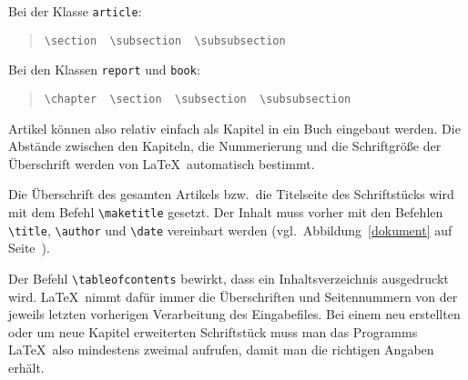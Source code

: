 \pagebreak[3] %
\noindent Bei der Klasse \texttt{article}:
\begin{quote}
\verb|\section  \subsection  \subsubsection|
\end{quote}
Bei den Klassen \texttt{report} und \texttt{book}:
\begin{quote}
\verb|\chapter  \section  \subsection  \subsubsection|
\end{quote}
Artikel können also relativ einfach als Kapitel in ein Buch
eingebaut werden.  Die Abstände zwischen den Kapiteln, die
Nummerierung und die Schriftgröße der Überschrift werden von
\LaTeX\ automatisch bestimmt.



Die Überschrift des gesamten Artikels bzw.\ die Titelseite des
Schriftstücks wird mit dem Befehl \verb|\maketitle| gesetzt.
Der Inhalt muss vorher mit den Befehlen \verb|\title|,
\verb|\author| und \verb|\date| vereinbart werden (vgl.\ 
Abbildung~\ref{dokument} auf Seite~\pageref{dokument}).

 
Der Befehl \verb|\tableofcontents| bewirkt, dass ein
Inhaltsverzeichnis ausgedruckt wird.
\LaTeX\ nimmt dafür immer die Überschriften und Seitennummern
von der jeweils letzten vorherigen Verarbeitung des Eingabefiles.
Bei einem neu erstellten oder um neue Kapitel erweiterten
Schriftstück muss man das Programms \LaTeX\ also mindestens
zweimal aufrufen, damit man die richtigen Angaben erhält.
 

